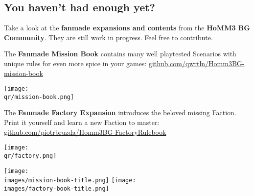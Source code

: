 \begin{multicols}{2}
\subsection*{You haven't had enough yet?}
Take a look at the \textbf{fanmade expansions and contents} from the \textbf{HoMM3 BG Community}. They are still work in progress. Feel free to contribute.
  \begin{itemize}
    \begin{minipage}{5cm}
      \item The \textbf{Fanmade Mission Book} contains many well playtested Scenarios with unique rules for even more spice in your games:
      \mbox{\footnotesize \href{https://github.com/qwrtln/Homm3BG-mission-book}{github.com/qwrtln/Homm3BG-mission-book}}
    \end{minipage}
    \hfill
    \begin{minipage}{2cm}
        \begin{center}
            \texttt{[image: \\qr/mission-book.png]}
            \scriptsize {}
        \end{center}
    \end{minipage}\par
    \smallskip
    \begin{minipage}{5cm}
      \item The \textbf{Fanmade Factory Expansion} introduces the beloved missing Faction.
      Print it yourself and learn a new Faction to master:
      {\footnotesize \href{https://github.com/piotrbruzda/Homm3BG-FactoryRulebook}{github.com/piotrbruzda/Homm3BG-FactoryRulebook}}
    \end{minipage}
    \hfill
    \begin{minipage}{2cm}
        \begin{center}
            \vspace*{-1em}
            \texttt{[image: \\qr/factory.png]}
            \scriptsize {}
        \end{center}
    \end{minipage}\par
    \smallskip
  \end{itemize}
  \begin{center}
    \hfill
    \texttt{[image: \\images/mission-book-title.png]}
    \texttt{[image: \\images/factory-book-title.png]}
  \end{center}
  \begin{itemize}

\end{itemize}
\end{multicols}
